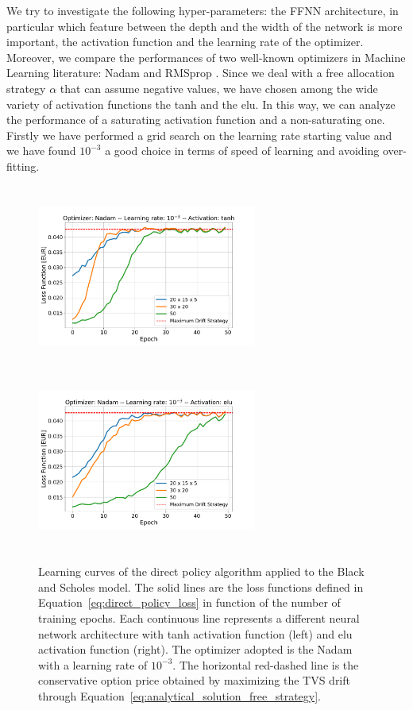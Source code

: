 \documentclass[11pt]{article}
\begin{document}
We try to investigate the following hyper-parameters: the FFNN architecture, in particular which feature between the depth and the width of the network is more important, the activation function and the learning rate of the optimizer. Moreover, we compare the performances of two well-known optimizers in Machine Learning literature: Nadam \citep{Dozat2016} and RMSprop \citep{Hiton2012}. Since we deal with a free allocation strategy $\alpha$ that can assume negative values, we have chosen among the wide variety of activation functions the tanh and the elu. In this way, we can analyze the performance of a saturating activation function and a non-saturating one. Firstly we have performed a grid search on the learning rate starting value and we have found $10^{-3}$ a good choice in terms of speed of learning and avoiding over-fitting.
 \begin{figure}[h!]
	\centering
	\includegraphics[width=7.2cm,height=6cm]{BS_fine_tuning_Nadam_tanh.pdf}
	\includegraphics[width=7.2cm,height=6cm]{BS_fine_tuning_Nadam_elu.pdf}
	\caption{Learning curves of the direct policy algorithm applied to the Black and Scholes model. The solid lines are the loss functions defined in Equation~\eqref{eq:direct_policy_loss} in function of the number of training epochs. Each continuous line represents a different neural network architecture with tanh activation function (left) and elu activation function (right). The optimizer adopted is the Nadam with a learning rate of $10^{-3}$. The horizontal red-dashed line is the conservative option price obtained by maximizing the TVS drift through Equation~\eqref{eq:analytical_solution_free_strategy}.}
	\label{fig:result_bs_nadam}
\end{figure}  
\end{document}
